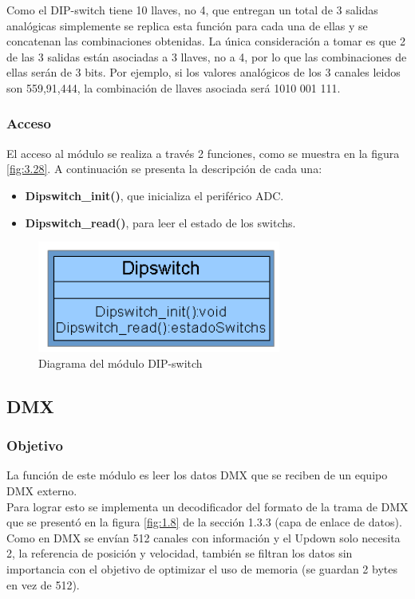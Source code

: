Como el DIP-switch tiene 10 llaves, no 4, que entregan un total de 3 salidas analógicas simplemente se replica esta función para cada una de ellas y se concatenan las combinaciones obtenidas. La única consideración a tomar es que 2 de las 3 salidas están asociadas a 3 llaves, no a 4, por lo que las combinaciones de ellas serán de 3 bits. Por ejemplo, si los valores analógicos de los 3 canales leidos son 559,91,444, la combinación de llaves asociada será 1010 001 111.

\subsubsection{Acceso}
El acceso al módulo se realiza a través 2 funciones, como se muestra en la figura \ref{fig:3.28}. A continuación se presenta la descripción de cada una:
\begin{itemize}
	\item \textbf{Dipswitch\_init()}, que inicializa el periférico ADC.
	\item \textbf{Dipswitch\_read()}, para leer el estado de los switchs.
\end{itemize}

\begin{figure}[!ht]
	\centering
	\includegraphics[width=8cm,scale=1]{resources/3_28-moduloDipswitch.png}
	\caption{Diagrama del módulo DIP-switch}
	\label{fig:\thefigure}
\end{figure}

\subsection{DMX}
\subsubsection{Objetivo}
La función de este módulo es leer los datos DMX que se reciben de un equipo DMX externo. \\
Para lograr esto se implementa un decodificador del formato de la trama de DMX que se presentó en la figura \ref{fig:1.8} de la sección 1.3.3 (capa de enlace de datos). Como en DMX se envían 512 canales con información y el Updown solo necesita 2, la referencia de posición y velocidad, también se filtran los datos sin importancia con el objetivo de optimizar el uso de memoria (se guardan 2 bytes en vez de 512).

